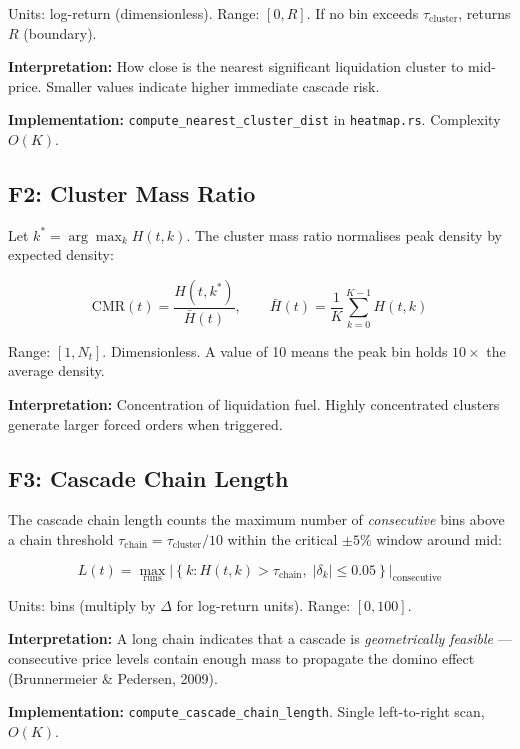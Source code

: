 \documentclass[11pt,a4paper]{article}
\begin{document}
Units: log-return (dimensionless). Range: $[0, R]$. If no bin exceeds $\tau_{\text{cluster}}$, returns $R$ (boundary).

\textbf{Interpretation:} How close is the nearest significant liquidation cluster to mid-price. Smaller values indicate higher immediate cascade risk.

\textbf{Implementation:} \texttt{compute\_nearest\_cluster\_dist} in \texttt{heatmap.rs}. Complexity $O(K)$.

\subsection{F2: Cluster Mass Ratio}

Let $k^* = \arg\max_k H(t,k)$. The cluster mass ratio normalises peak density by expected density:

\begin{equation}
\text{CMR}(t) = \frac{H(t, k^*)}{\bar{H}(t)}, \qquad \bar{H}(t) = \frac{1}{K} \sum_{k=0}^{K-1} H(t, k)
\end{equation}

Range: $[1, N_t]$. Dimensionless. A value of 10 means the peak bin holds $10\times$ the average density.

\textbf{Interpretation:} Concentration of liquidation fuel. Highly concentrated clusters generate larger forced orders when triggered.

\subsection{F3: Cascade Chain Length}

The cascade chain length counts the maximum number of \textit{consecutive} bins above a chain threshold $\tau_{\text{chain}} = \tau_{\text{cluster}} / 10$ within the critical $\pm 5\%$ window around mid:

\begin{equation}
L(t) = \max_{\text{runs}} \left|\left\{k : H(t,k) > \tau_{\text{chain}},\; |\delta_k| \leq 0.05\right\}\right|_{\text{consecutive}}
\end{equation}

Units: bins (multiply by $\Delta$ for log-return units). Range: $[0, 100]$.

\textbf{Interpretation:} A long chain indicates that a cascade is \textit{geometrically feasible} --- consecutive price levels contain enough mass to propagate the domino effect (Brunnermeier \& Pedersen, 2009).

\textbf{Implementation:} \texttt{compute\_cascade\_chain\_length}. Single left-to-right scan, $O(K)$.
\end{document}
